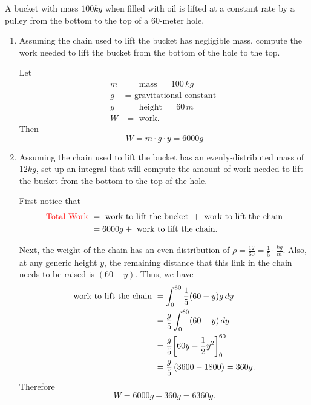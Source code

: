 \documentclass[noinstructornotes]{ximera}
\begin{document}
\begin{problem}
A bucket with mass $100kg$ when filled with oil is lifted at a constant rate by a pulley from the bottom to the top of a $60$-meter hole.
	\begin{enumerate}
		\item  Assuming the chain used to lift the bucket has negligible mass, compute the work needed to lift the bucket from the bottom of the hole to the top.  
		\begin{freeResponse}
		Let
			\begin{align*}
			m &= \text{ mass } = 100 \, kg  \\
			g &= \text{ gravitational constant }  \\
			y &= \text{ height } = 60 \, m  \\
			W &= \text{ work}.
			\end{align*}
		Then
			\[
			W = m \cdot g \cdot y = 6000 g
			\]
		\end{freeResponse}
		
		
		
		\item  Assuming the chain used to lift the bucket has an evenly-distributed mass of $12kg$, set up an integral that will compute the amount of work needed to lift the bucket from the bottom to the top of the hole.  
		\begin{freeResponse}
		First notice that
			\begin{align*}
			\text{{\color{red}Total Work} } &= \text{ work to lift the bucket } + \text{ work to lift the chain}  \\
			&= 6000 g + \text{ work to lift the chain}.
			\end{align*}
		
		Next, the weight of the chain has an even distribution of $\rho = \frac{12}{60} = \frac{1}{5} \cdot \frac{kg}{m}$.  
		Also, at any generic height $y$, the remaining distance that this link in the chain needs to be raised is $(60-y)$.  
		Thus, we have
			\begin{align*}
			\text{work to lift the chain } &= \int_0^{60} \frac{1}{5} (60-y) g \,d y  \\
			&= \frac{g}{5} \int_0^{60} (60-y) \,d y  \\
			&= \frac{g}{5} \bigg[ 60y - \frac{1}{2} y^2 \bigg]_0^{60}  \\
			&= \frac{g}{5} \left( 3600 - 1800 \right) = 360g.
			\end{align*}
		Therefore
			\[
			W = 6000g + 360g = 6360g.
			\]
		\end{freeResponse}
		

\end{enumerate}
\end{problem}
\end{document}
